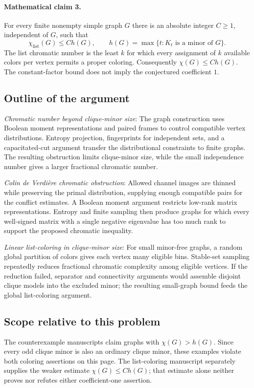 \documentclass[11pt]{article}
\begin{document}
\paragraph{Mathematical claim 3.} For every finite nonempty simple graph $G$ there is an absolute integer $C\ge1$, independent of $G$, such that \[\chi_{\mathrm{list}}(G)\le C h(G),\qquad h(G)=\max\{t:K_t\text{ is a minor of }G\}.\] The list chromatic number is the least $k$ for which every assignment of $k$ available colors per vertex permits a proper coloring. Consequently $\chi(G)\le Ch(G)$. The constant-factor bound does not imply the conjectured coefficient $1$.

\subsection{Outline of the argument}
\textit{Chromatic number beyond clique-minor size}: The graph construction uses Boolean moment representations and paired frames to control compatible vertex distributions. Entropy projection, fingerprints for independent sets, and a capacitated-cut argument transfer the distributional constraints to finite graphs. The resulting obstruction limits clique-minor size, while the small independence number gives a larger fractional chromatic number.

\textit{Colin de Verdière chromatic obstruction}: Allowed channel images are thinned while preserving the primal distribution, supplying enough compatible pairs for the conflict estimates. A Boolean moment argument restricts low-rank matrix representations. Entropy and finite sampling then produce graphs for which every well-signed matrix with a single negative eigenvalue has too much rank to support the proposed chromatic inequality.

\textit{Linear list-coloring in clique-minor size}: For small minor-free graphs, a random global partition of colors gives each vertex many eligible bins. Stable-set sampling repeatedly reduces fractional chromatic complexity among eligible vertices. If the reduction failed, separator and connectivity arguments would assemble disjoint clique models into the excluded minor; the resulting small-graph bound feeds the global list-coloring argument.

\subsection{Scope relative to this problem}
The counterexample manuscripts claim graphs with $\chi(G)>h(G)$. Since every odd clique minor is also an ordinary clique minor, these examples violate both coloring assertions on this page. The list-coloring manuscript separately supplies the weaker estimate $\chi(G)\le C h(G)$; that estimate alone neither proves nor refutes either coefficient-one assertion.
\end{document}
